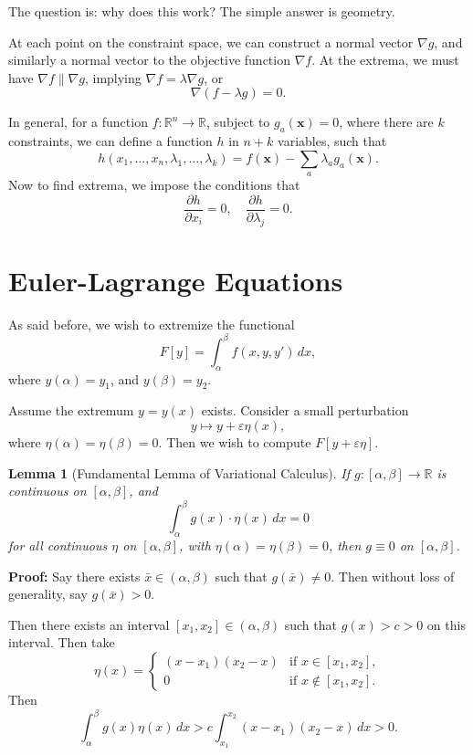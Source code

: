 \documentclass[12pt]{article}
\newtheorem{lemma}{Lemma}[section]
\theoremstyle{definition}
\theoremstyle{remark}
\begin{document}
The question is: why does this work? The simple answer is geometry.

At each point on the constraint space, we can construct a normal vector $\nabla g$, and similarly a normal vector to the objective function $\nabla f$. At the extrema, we must have $\nabla f \parallel \nabla g$, implying $\nabla f = \lambda \nabla g$, or
\[
	\nabla (f - \lambda g) = 0
.\]

In general, for a function $f : \mathbb{R}^{n} \to \mathbb{R}$, subject to $g_{a}(\mathbf{x}) = 0$, where there are $k$ constraints, we can define a function $h$ in $n + k$ variables, such that
\[
	h(x_1, \ldots, x_n, \lambda_1, \ldots, \lambda_k) = f(\mathbf{x}) - \sum_{a} \lambda_a g_a(\mathbf{x})
.\]
Now to find extrema, we impose the conditions that
\[
	\frac{\partial h}{\partial x_i} = 0, \quad \frac{\partial h}{\partial \lambda_j} = 0
.\]

\newpage

\section{Euler-Lagrange Equations}%
\label{sec:euler_lagrange_equations}

As said before, we wish to extremize the functional
\[
	F[y] = \int_{\alpha}^{\beta} f(x, y, y') \, dx
,\]
where $y(\alpha) = y_1$, and $y(\beta) = y_2$.

Assume the extremum $y = y(x)$ exists. Consider a small perturbation
\[
	y \mapsto y + \varepsilon \eta (x)
,\]
where $\eta (\alpha) = \eta (\beta) = 0$. Then we wish to compute $F[y + \varepsilon \eta]$.

\begin{lemma}[Fundamental Lemma of Variational Calculus]\label{lem:flovc}
	If $g : [\alpha, \beta] \to \mathbb{R}$ is continuous on $[\alpha, \beta]$, and
	\[
		\int_{\alpha}^{\beta} g(x) \cdot \eta(x) \, dx = 0
	\]
	for all continuous $\eta$ on $[\alpha, \beta]$, with $\eta(\alpha) = \eta(\beta) = 0$, then $g \equiv 0$ on $[\alpha, \beta]$.
\end{lemma}

\begin{adjustbox}{minipage = \columnwidth - 25.5pt, margin=1em, frame=1pt, margin=0em}
	\textbf{Proof:} Say there exists $\bar x \in (\alpha, \beta)$ such that $g(\bar x) \neq 0$. Then  without loss of generality, say $g(\bar x) > 0$.

	Then there exists an interval $[x_1, x_2] \in (\alpha, \beta)$ such that $g(x) > c > 0$ on this interval. Then take
	\[
		\eta (x) =
		\begin{cases}
			(x - x_1)(x_2 - x) & \text{if } x \in [x_1, x_2], \\
			0 & \text{if } x \not \in [x_1, x_2].
		\end{cases}
	\]
	Then
	\[
		\int_{\alpha}^{\beta} g(x) \eta (x) \, dx > c \int_{x_1}^{x_2} (x - x_1)(x_2 - x) \, dx > 0
	.\]
\end{adjustbox}
\end{document}
